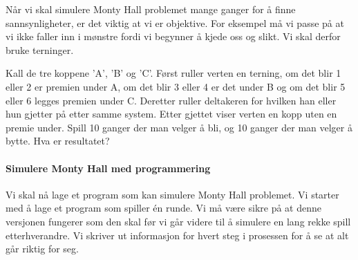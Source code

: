 \documentclass[11pt]{article}
\begin{document}
Når vi skal simulere Monty Hall problemet mange ganger for å finne
sannsynligheter, er det viktig at vi er objektive. For eksempel må vi
passe på at vi ikke faller inn i mønstre fordi vi begynner å kjede oss
og slikt. Vi skal derfor bruke terninger.

Kall de tre koppene 'A', 'B' og 'C'. Først ruller verten en terning, om
det blir 1 eller 2 er premien under A, om det blir 3 eller 4 er det
under B og om det blir 5 eller 6 legges premien under C. Deretter ruller
deltakeren for hvilken han eller hun gjetter på etter samme system.
Etter gjettet viser verten en kopp uten en premie under. Spill 10 ganger
der man velger å bli, og 10 ganger der man velger å bytte. Hva er
resultatet?

    \paragraph{Simulere Monty Hall med
programmering}\label{simulere-monty-hall-med-programmering}

Vi skal nå lage et program som kan simulere Monty Hall problemet. Vi
starter med å lage et program som spiller én runde. Vi må være sikre på
at denne versjonen fungerer som den skal før vi går videre til å
simulere en lang rekke spill etterhverandre. Vi skriver ut informasjon
for hvert steg i prosessen for å se at alt går riktig for seg.
\end{document}
